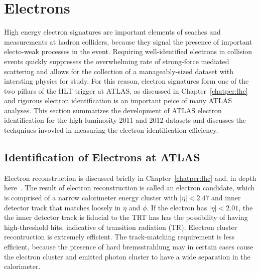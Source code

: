 \chapter[Electrons][Electrons]{Electrons}
\label{chapter:electron} 

High energy electron signatures are important elements of seaches and measurements at hadron colliders, because they signal the presence of important electo-weak processes in the event. Requiring well-identified electrons in collision events quickly suppresses the overwhelming rate of strong-force mediated scattering and allows for the collection of a manageably-sized dataset with intersting physics for study. For this reason, electron signatures form one of the two pillars of the HLT trigger at ATLAS, as discussed in Chapter~\ref{chatper:lhc} and rigorous electron identification is an important peice of many ATLAS analyses. This section summarizes the development of ATLAS electron identification for the high luminosity 2011 and 2012 datasets and discusses the techqniues invovled in measuring the electron identification efficiency. 

\section{Identification of Electrons at ATLAS}


Electron reconstruction is discussed briefly in Chapter~\ref{chatper:lhc} and, in depth here~\cite{}. The result of electron reconstruction is called an electron candidate, which is comprised of a narrow calorimeter energy cluster with $|\eta| < 2.47$ and inner detector track that matches loosely in $\eta$ and $\phi$. If the electron has $|\eta| < 2.01$, the the inner detector track is fiducial to the TRT has has the possibility of having high-threshold hits, indicative of transition radiation (TR). Electron cluster recontruction is extremely efficient. The track-matching requirement is less efficient, because the presence of hard bremsstrahlung may in certain cases cause the electron cluster and emitted photon cluster to have a wide separation in the calorimeter\cite{}. 

